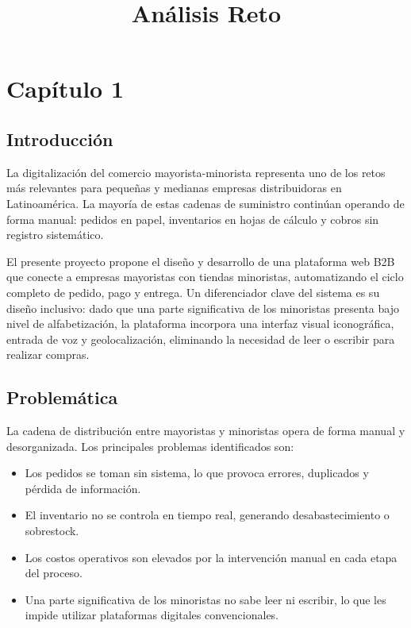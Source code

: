 \documentclass[12pt, a4paper]{article}
\title{\textbf{Análisis Reto}}
\author{}
\date{}
\begin{document}
\maketitle
\tableofcontents
\newpage

\section{Capítulo 1}

\subsection{Introducción}

La digitalización del comercio mayorista-minorista representa uno de los retos más relevantes para pequeñas y medianas empresas distribuidoras en Latinoamérica. La mayoría de estas cadenas de suministro continúan operando de forma manual: pedidos en papel, inventarios en hojas de cálculo y cobros sin registro sistemático.

El presente proyecto propone el diseño y desarrollo de una plataforma web B2B que conecte a empresas mayoristas con tiendas minoristas, automatizando el ciclo completo de pedido, pago y entrega. Un diferenciador clave del sistema es su diseño inclusivo: dado que una parte significativa de los minoristas presenta bajo nivel de alfabetización, la plataforma incorpora una interfaz visual iconográfica, entrada de voz y geolocalización, eliminando la necesidad de leer o escribir para realizar compras.

\subsection{Problemática}

La cadena de distribución entre mayoristas y minoristas opera de forma manual y desorganizada. Los principales problemas identificados son:

\begin{itemize}
  \item Los pedidos se toman sin sistema, lo que provoca errores, duplicados y pérdida de información.
  \item El inventario no se controla en tiempo real, generando desabastecimiento o sobrestock.
  \item Los costos operativos son elevados por la intervención manual en cada etapa del proceso.
  \item Una parte significativa de los minoristas no sabe leer ni escribir, lo que les impide utilizar plataformas digitales convencionales.
\end{itemize}
\end{document}
